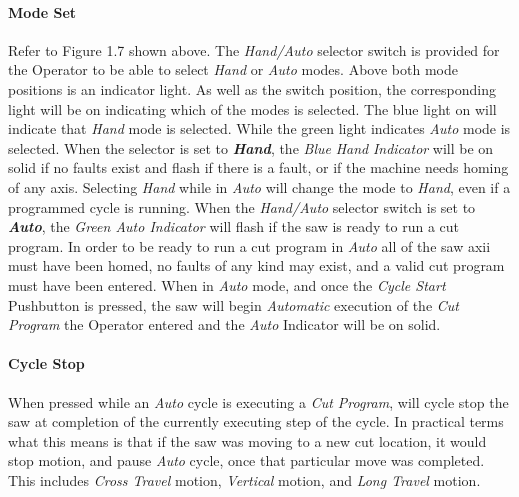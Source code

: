 \paragraph*{Mode Set} Refer to Figure 1.7 shown above. The \textit{Hand/Auto} selector switch is provided for the Operator to be able to select \textit{Hand} or \textit{Auto} modes. Above both mode positions is an indicator light. As well as the switch position, the corresponding light will be on indicating which of the modes is selected. The blue light on will indicate that \textit{Hand} mode is selected. While the green light indicates \textit{Auto} mode is selected. When the selector is set to \textbf{\textit{Hand}}, the \textit{Blue} \textit{Hand} \textit{Indicator} will be on solid if no faults exist and flash if there is a fault, or if the machine needs homing of any axis. Selecting \textit{Hand} while in \textit{Auto} will change the mode to \textit{Hand}, even if a programmed cycle is running. When the \textit{Hand/Auto} selector switch is set to \textbf{\textit{Auto}}, the \textit{Green Auto Indicator} will flash if the saw is ready to run a cut program. In order to be ready to run a cut program in \textit{Auto} all of the saw axii must have been homed, no faults of any kind may exist, and a valid cut program must have been entered. When in \textit{Auto} mode, and once the \textit{Cycle Start} Pushbutton is pressed, the saw will begin \textit{Automatic} execution of the \textit{Cut Program} the Operator entered and the \textit{Auto} Indicator will be on solid.
\paragraph*{Cycle Stop} When pressed while an \textit{Auto} cycle is executing a \textit{Cut Program}, will cycle stop the saw at completion of the currently executing step of the cycle. In practical terms what this means is that if the saw was moving to a new cut location, it would stop motion, and pause \textit{Auto} cycle, once that particular move was completed. This includes \textit{Cross Travel} motion, \textit{Vertical} motion, and \textit{Long Travel} motion.